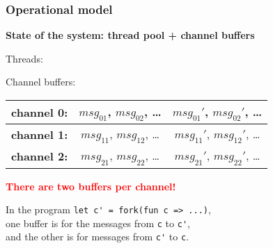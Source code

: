 \documentclass[aspectratio=169]{beamer}
\newcommand{\remph}[1] {\textcolor{red}{\textbf{#1}}}
\begin{document}
\begin{frame}[fragile]
  \frametitle{Operational model}
  \textbf{State of the system: thread pool + channel buffers}
  \bigskip

  \noindent
  \begin{minipage}[t]{.4\textwidth}
    Threads:\medskip

  \end{minipage}\begin{minipage}[t]{.4\textwidth}
  Channel buffers:\medskip

  \begin{tabular}{ | c | c | c | }
    \hline
    \textbf{channel 0:} & $msg_{01}$, $msg_{02}$, \ldots & $msg_{01}'$, $msg_{02}'$, \ldots \\
    \hline
    \textbf{channel 1:} & $msg_{11}$, $msg_{12}$, \ldots & $msg_{11}'$, $msg_{12}'$, \ldots \\
    \hline
    \textbf{channel 2:} & $msg_{21}$, $msg_{22}$, \ldots & $msg_{21}'$, $msg_{22}'$, \ldots \\
    \hline
  \end{tabular}
  \end{minipage}

  \bigskip
  \remph{There are two buffers per channel!}

  In the program \lstinline|let c' = fork(fun c => ...)|, \\
  one buffer is for the messages from \lstinline|c| to \lstinline|c'|, \\
  and the other is for messages from \lstinline|c'| to \lstinline|c|.
\end{frame}
\end{document}
